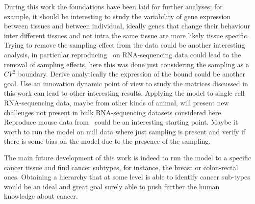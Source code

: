 During this work the foundations have been laid for further analyses; for example, it should be interesting to study the variability of gene expression between tissues and between individual, ideally genes that change their behaviour inter different tissues and not intra the same tissue are more likely tissue specific. Trying to remove the sampling effect from the data could be another interesting analysis, in particular reproducing~\cite{Grilli} on RNA-sequencing data could lead to the removal of sampling effects, here this was done just considering the sampling as a $CV^2$ boundary. Derive analytically the expression of the bound could be another goal. Use an innovation dynamic point of view to study the matrices discussed in this work can lead to other interesting results. Applying the model to single cell RNA-sequencing data, maybe from other kinds of animal, will present new challenges not present in bulk RNA-sequencing datasets considered here. Reproduce mouse data from~\cite{Scialdone2016} could be an interesting starting point. Maybe it worth to run the model on null data where just sampling is present and verify if there is some bias on the model due to the presence of the sampling.

The main future development of this work is indeed to run the model to a specific cancer tissue and find cancer subtypes, for instance, the breast or colon-rectal ones. Obtaining a hierarchy that at some level is able to identify cancer sub-types would be an ideal and great goal surely able to push further the human knowledge about cancer. 